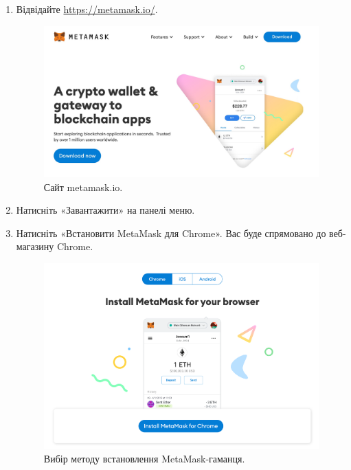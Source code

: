 \begin{enumerate}
    \item Відвідайте \url{https://metamask.io/}.
    
    \begin{figure}[ht]
        \centering
        \includegraphics[scale=0.22]{IMAGES/metamask1.jpeg}
        \caption{Сайт metamask.io.}
        \label{fig_sudak}
    \end{figure}
    
    \item Натисніть «Завантажити» на панелі меню.

    \item Натисніть «Встановити MetaMask для Chrome». Вас буде спрямовано до веб-магазину Chrome.

    \begin{figure}[ht]
        \centering
        \includegraphics[scale=0.45]{IMAGES/metamask2.png}
        \caption{Вибір методу встановлення MetaMask-гаманця.}
        \label{fig_sudak}
    \end{figure}


\end{enumerate}
